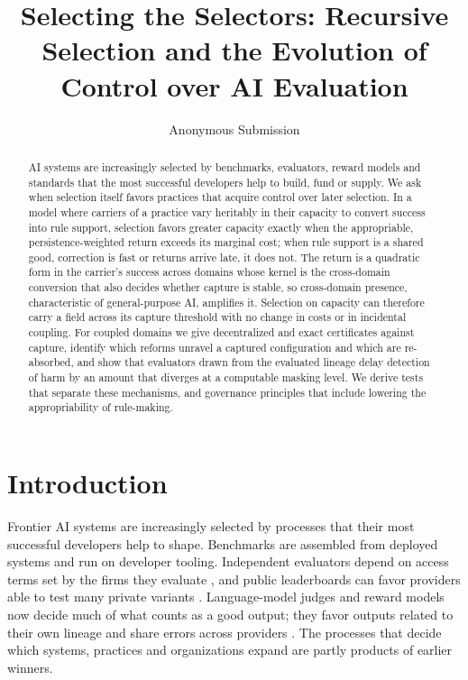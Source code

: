 \documentclass[letterpaper]{article} %
\title{Selecting the Selectors: Recursive Selection and the Evolution of Control over AI Evaluation}
\author{Anonymous Submission}
\theoremstyle{definition}
\begin{document}
\maketitle

\begin{abstract}
AI systems are increasingly selected by benchmarks, evaluators, reward models and standards that the most successful developers help to build, fund or supply. We ask when selection itself favors practices that acquire control over later selection. In a model where carriers of a practice vary heritably in their capacity to convert success into rule support, selection favors greater capacity exactly when the appropriable, persistence-weighted return exceeds its marginal cost; when rule support is a shared good, correction is fast or returns arrive late, it does not. The return is a quadratic form in the carrier's success across domains whose kernel is the cross-domain conversion that also decides whether capture is stable, so cross-domain presence, characteristic of general-purpose AI, amplifies it. Selection on capacity can therefore carry a field across its capture threshold with no change in costs or in incidental coupling. For coupled domains we give decentralized and exact certificates against capture, identify which reforms unravel a captured configuration and which are re-absorbed, and show that evaluators drawn from the evaluated lineage delay detection of harm by an amount that diverges at a computable masking level. We derive tests that separate these mechanisms, and governance principles that include lowering the appropriability of rule-making.
\end{abstract}

\section{Introduction}

Frontier AI systems are increasingly selected by processes that their most successful developers help to shape. Benchmarks are assembled from deployed systems and run on developer tooling. Independent evaluators depend on access terms set by the firms they evaluate \citep{longpre2024}, and public leaderboards can favor providers able to test many private variants \citep{singh2025}. Language-model judges and reward models now decide much of what counts as a good output; they favor outputs related to their own lineage \citep{panickssery2024,li2026preference,awuni2026} and share errors across providers \citep{kim2025,goel2025}. The processes that decide which systems, practices and organizations expand are partly products of earlier winners.
\end{document}
